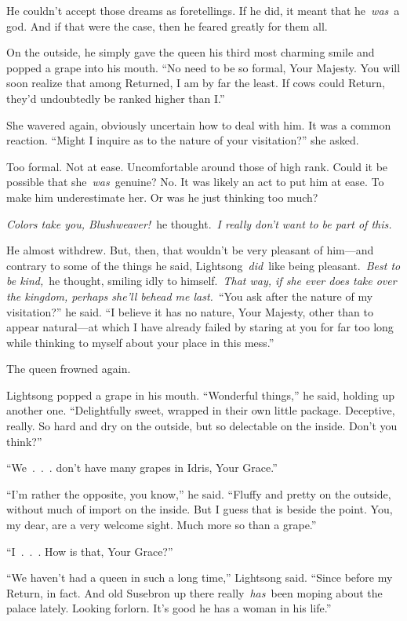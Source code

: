 He couldn’t accept those dreams as foretellings. If he did, it meant that he~\textit{was}~a god. And if that were the case, then he feared greatly for them all.

On the outside, he simply gave the queen his third most charming smile and popped a grape into his mouth. “No need to be so formal, Your Majesty. You will soon realize that among Returned, I am by far the least. If cows could Return, they’d undoubtedly be ranked higher than I.”

She wavered again, obviously uncertain how to deal with him. It was a common reaction. “Might I inquire as to the nature of your visitation?” she asked.

Too formal. Not at ease. Uncomfortable around those of high rank. Could it be possible that she~\textit{was}~genuine? No. It was likely an act to put him at ease. To make him underestimate her. Or was he just thinking too much?

\textit{Colors take you, Blushweaver!}~he thought.~\textit{I really don’t want to be part of this.}

He almost withdrew. But, then, that wouldn’t be very pleasant of him—and contrary to some of the things he said, Lightsong~\textit{did}~like being pleasant.~\textit{Best to be kind,}~he thought, smiling idly to himself.~\textit{That way, if she ever does take over the kingdom, perhaps she’ll behead me last.}~“You ask after the nature of my visitation?” he said. “I believe it has no nature, Your Majesty, other than to appear natural—at which I have already failed by staring at you for far too long while thinking to myself about your place in this mess.”

The queen frowned again.

Lightsong popped a grape in his mouth. “Wonderful things,” he said, holding up another one. “Delightfully sweet, wrapped in their own little package. Deceptive, really. So hard and dry on the outside, but so delectable on the inside. Don’t you think?”

“We~.~.~. don’t have many grapes in Idris, Your Grace.”

“I’m rather the opposite, you know,” he said. “Fluffy and pretty on the outside, without much of import on the inside. But I guess that is beside the point. You, my dear, are a very welcome sight. Much more so than a grape.”

“I~.~.~. How is that, Your Grace?”

“We haven’t had a queen in such a long time,” Lightsong said. “Since before my Return, in fact. And old Susebron up there really~\textit{has}~been moping about the palace lately. Looking forlorn. It’s good he has a woman in his life.”

